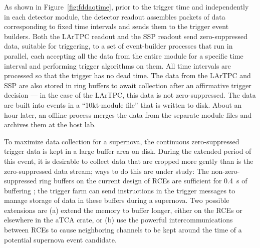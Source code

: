 As shown in Figure~\ref{fig:fddaqtime}, prior to the trigger time and
independently in each detector module, the detector readout assembles
packets of data corresponding to fixed time intervals and sends them
to the trigger event builders.  Both the LArTPC readout and the SSP
readout send zero-suppressed data, suitable for triggering, to a set
of event-builder processes that run in parallel, each accepting all
the data from the entire  module for a specific time interval and
performing trigger algorithms on them.  All time intervals are
processed so that the trigger has no dead time.  The data from the LArTPC and SSP
are also stored in ring buffers
  to await collection after an
affirmative trigger decision --- in the case of the LArTPC, this data
is not zero-suppressed.  The data are built into events in a ``10kt-module
file'' that is written to disk.  About an hour later, an offline process merges
the data from the separate  module files and archives them at the host lab.

To maximize data collection for a supernova, the continuous
zero-suppressed trigger data is kept in a large buffer area on disk.
During the extended period of this event, it is desirable to collect data that are cropped 
more gently than is the zero-suppressed data stream; ways to do this are
under study: 
The non-zero-suppressed ring buffers on the current
design of RCEs are
sufficient for 0.4~s of buffering ; the trigger farm can send
instructions in the trigger messages to manage storage of data in
these buffers during a supernova.  Two possible extensions
are (a) extend the memory to buffer longer, either on the RCEs or
elsewhere in the aTCA crate, or (b) use the powerful intercommunications between
RCEs to cause neighboring channels to be kept around the time of a
potential supernova event candidate. 


